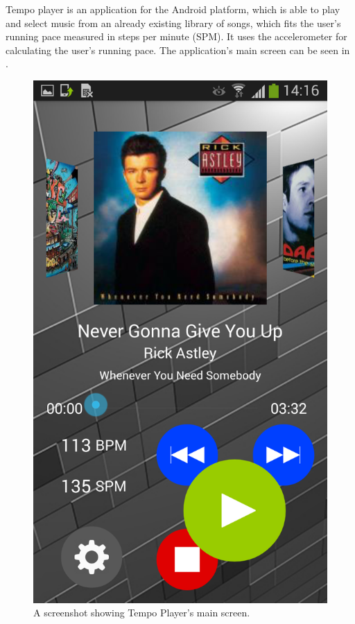 Tempo player is an application for the Android platform, which is able to play and select music from an already existing library of songs, which fits the user's running pace measured in steps per minute (SPM). It uses the accelerometer for calculating the user's running pace. The application's main screen can be seen in . 

\begin{figure}[h!]
  \centering
    \includegraphics[scale=0.2]{Images/Screenshots/mainScreen.png}
  \caption{A screenshot showing Tempo Player's main screen.}
  \label{fig:mainScreen}
\end{figure}

